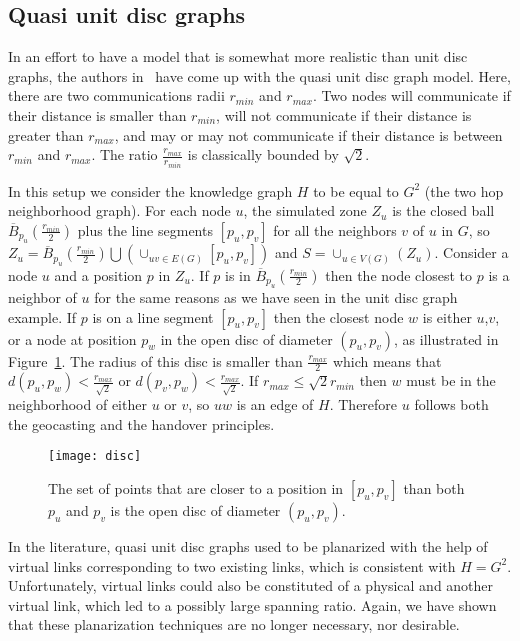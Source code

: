 \documentclass{article}
\begin{document}
\subsection{Quasi unit disc graphs}
\label{sub_quasi}
In an effort to have a model that is somewhat more realistic than unit disc graphs, the authors in~\cite{bib_quasi_udg} have come up with the quasi unit disc graph model. Here, there are two communications radii $r_{min}$ and $r_{max}$. Two nodes will communicate if their distance is smaller than $r_{min}$, will not communicate if their distance is greater than $r_{max}$, and may or may not communicate if their distance is between $r_{min}$ and $r_{max}$. The ratio $\frac{r_{max}}{r_{min}}$ is classically bounded by $\sqrt{2}$.

In this setup we consider the knowledge graph $H$ to be equal to $G^2$ (the two hop neighborhood graph). For each node $u$, the simulated zone $Z_u$ is the closed ball $\overline{B}_{p_u}(\frac{r_{min}}{2})$ plus the line segments $[p_u,p_v]$ for all the neighbors $v$ of $u$ in $G$, so $Z_u=\overline{B}_{p_u}(\frac{r_{min}}{2})\bigcup(\cup_{uv\in E(G)}[p_u,p_v])$ and $S=\cup_{u\in V(G)}(Z_u)$.
Consider a node $u$ and a position $p$ in $Z_u$. If $p$ is in $\overline{B}_{p_u}(\frac{r_{min}}{2})$ then the node closest to $p$ is a neighbor of $u$ for the same reasons as we have seen in the unit disc graph example. If $p$ is on a line segment $[p_u,p_v]$ then the closest node $w$ is either $u$,$v$, or a node at position $p_w$ in the open disc of diameter $(p_u,p_v)$, as illustrated in Figure~\ref{fig_disc}. The radius of this disc is smaller than $\frac{r_{max}}{2}$ which means that $d(p_u,p_w)<\frac{r_{max}}{\sqrt{2}}$ or $d(p_v,p_w)<\frac{r_{max}}{\sqrt{2}}$. If $r_{max}\leq\sqrt{2}r_{min}$ then $w$ must be in the neighborhood of either $u$ or $v$, so $uw$ is an edge of $H$. Therefore $u$ follows both the geocasting and the handover principles.

\begin{figure}[h]
\begin{center}
\texttt{[image: disc]}
\caption{The set of points that are closer to a position in $[p_u,p_v]$ than both $p_u$ and $p_v$ is the open disc of diameter $(p_u,p_v)$.}
\label{fig_disc}
\end{center}
\end{figure}

In the literature, quasi unit disc graphs used to be planarized with the help of virtual links corresponding to two existing links, which is consistent with $H=G^2$. Unfortunately, virtual links could also be constituted of a physical and another virtual link, which led to a possibly large spanning ratio. Again, we have shown that these planarization techniques are no longer necessary, nor desirable.
\end{document}
